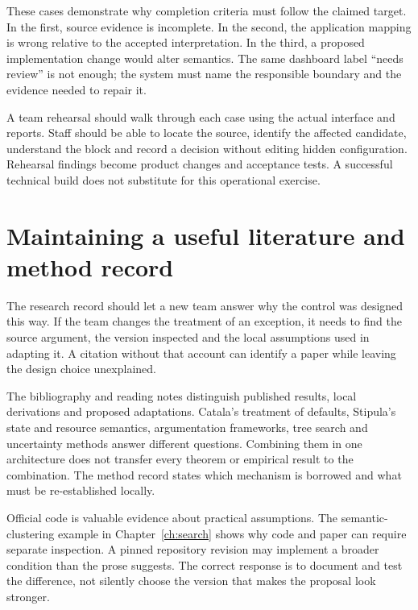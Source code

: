 These cases demonstrate why completion criteria must follow the claimed target.
In the first, source evidence is incomplete. In the second, the application mapping
is wrong relative to the accepted interpretation. In the third, a proposed
implementation change would alter semantics. The same dashboard label ``needs
review'' is not enough; the system must name the responsible boundary and the
evidence needed to repair it.

A team rehearsal should walk through each case using the actual interface and
reports. Staff should be able to locate the source, identify the affected
candidate, understand the block and record a decision without editing hidden
configuration. Rehearsal findings become product changes and acceptance tests.
A successful technical build does not substitute for this operational exercise.

\section{Maintaining a useful literature and method record}
\label{merge:M10:13}


The research record should let a new team answer why the control was designed
this way. If the team changes the treatment of an exception, it needs to find
the source argument, the version inspected and the local assumptions used in
adapting it. A citation without that account can identify a paper while leaving
the design choice unexplained.

The bibliography and reading notes distinguish published results, local
derivations and proposed adaptations. Catala's treatment of defaults, Stipula's
state and resource semantics, argumentation frameworks, tree search and uncertainty
methods answer different questions. Combining them in one architecture does not
transfer every theorem or empirical result to the combination. The method record
states which mechanism is borrowed and what must be re-established locally.


Official code is valuable evidence about practical assumptions. The semantic-
clustering example in Chapter~\ref{ch:search} shows why code and paper can require
separate inspection. A pinned repository revision may implement a broader
condition than the prose suggests. The correct response is to document and test
the difference, not silently choose the version that makes the proposal look
stronger.

